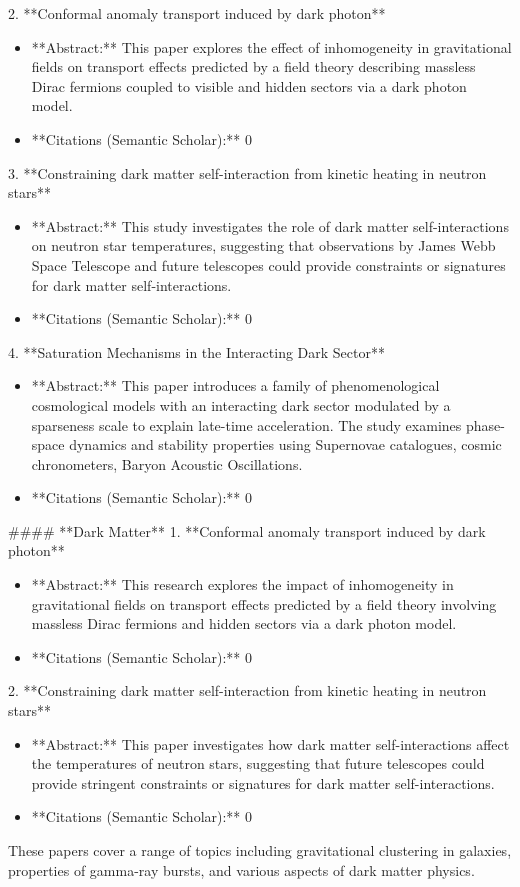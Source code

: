 \documentclass[11pt]{article}
\begin{document}
2. **Conformal anomaly transport induced by dark photon**
\begin{itemize}
\item **Abstract:** This paper explores the effect of inhomogeneity in gravitational fields on transport effects predicted by a field theory describing massless Dirac fermions coupled to visible and hidden sectors via a dark photon model.
\item **Citations (Semantic Scholar):** 0
\end{itemize}
3. **Constraining dark matter self-interaction from kinetic heating in neutron stars**
\begin{itemize}
\item **Abstract:** This study investigates the role of dark matter self-interactions on neutron star temperatures, suggesting that observations by James Webb Space Telescope and future telescopes could provide constraints or signatures for dark matter self-interactions.
\item **Citations (Semantic Scholar):** 0
\end{itemize}
4. **Saturation Mechanisms in the Interacting Dark Sector**
\begin{itemize}
\item **Abstract:** This paper introduces a family of phenomenological cosmological models with an interacting dark sector modulated by a sparseness scale to explain late-time acceleration. The study examines phase-space dynamics and stability properties using Supernovae catalogues, cosmic chronometers, Baryon Acoustic Oscillations.
\item **Citations (Semantic Scholar):** 0
\end{itemize}
\#\#\#\# **Dark Matter**
1. **Conformal anomaly transport induced by dark photon**
\begin{itemize}
\item **Abstract:** This research explores the impact of inhomogeneity in gravitational fields on transport effects predicted by a field theory involving massless Dirac fermions and hidden sectors via a dark photon model.
\item **Citations (Semantic Scholar):** 0
\end{itemize}
2. **Constraining dark matter self-interaction from kinetic heating in neutron stars**
\begin{itemize}
\item **Abstract:** This paper investigates how dark matter self-interactions affect the temperatures of neutron stars, suggesting that future telescopes could provide stringent constraints or signatures for dark matter self-interactions.
\item **Citations (Semantic Scholar):** 0
\end{itemize}
These papers cover a range of topics including gravitational clustering in galaxies, properties of gamma-ray bursts, and various aspects of dark matter physics.
\newpage
\end{document}
